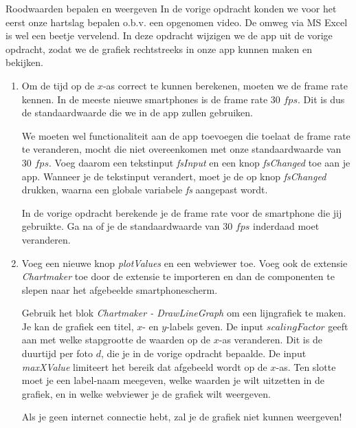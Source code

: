 \begin{opdracht}{Roodwaarden bepalen en weergeven}
	In de vorige opdracht konden we voor het eerst onze hartslag bepalen o.b.v. een opgenomen video. De omweg via MS Excel is wel een beetje vervelend. In deze opdracht wijzigen we de app uit de vorige opdracht, zodat we de grafiek rechtstreeks in onze app kunnen maken en bekijken.
	
	\begin{enumerate}
		\item Om de tijd op de $x$-as correct te kunnen berekenen, moeten we de frame rate kennen. In de meeste nieuwe smartphones is de frame rate 30 $fps$. Dit is dus de standaardwaarde die we in de app zullen gebruiken.
		
		We moeten wel functionaliteit aan de app toevoegen die toelaat de frame rate te veranderen, mocht die niet overeenkomen met onze standaardwaarde van 30 $fps$. Voeg daarom een tekstinput \emph{fsInput} en een knop \emph{fsChanged} toe aan je app. Wanneer je de tekstinput verandert, moet je de op knop \emph{fsChanged} drukken, waarna een globale variabele \emph{fs} aangepast wordt.
		
		In de vorige opdracht berekende je de frame rate voor de smartphone die jij gebruikte. Ga na of je de standaardwaarde van 30 $fps$ inderdaad moet veranderen.
		
		\item Voeg een nieuwe knop \emph{plotValues} en een webviewer toe. Voeg ook de extensie \emph{Chartmaker} toe door de extensie te importeren en dan de componenten te slepen naar het afgebeelde smartphonescherm.
		
		Gebruik het blok \emph{Chartmaker - DrawLineGraph} om een lijngrafiek te maken. Je kan de grafiek een titel, $x$- en $y$-labels geven. De input $scalingFactor$ geeft aan met welke stapgrootte de waarden op de $x$-as veranderen. Dit is de duurtijd per foto $d$, die je in de vorige opdracht bepaalde. De input \emph{maxXValue} limiteert het bereik dat afgebeeld wordt op de $x$-as. Ten slotte moet je een label-naam meegeven, welke waarden je wilt uitzetten in de grafiek, en in welke webviewer je de grafiek wilt weergeven.
		
		\begin{opmerking}
			Als je geen internet connectie hebt, zal je de grafiek niet kunnen weergeven! 
		\end{opmerking}
	\end{enumerate}
\end{opdracht}
	


